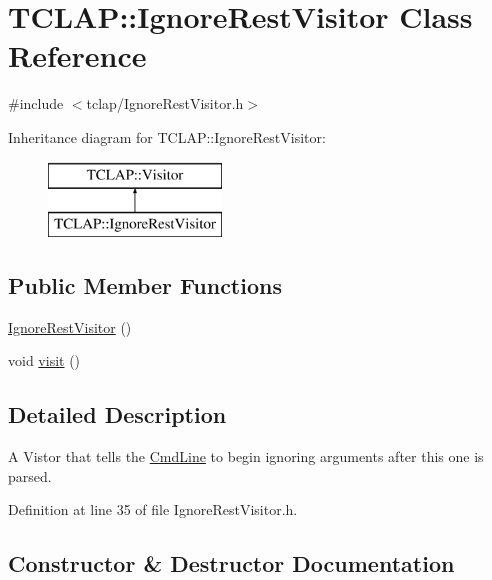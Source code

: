 \hypertarget{class_t_c_l_a_p_1_1_ignore_rest_visitor}{}\section{T\+C\+L\+A\+P\+:\+:Ignore\+Rest\+Visitor Class Reference}
\label{class_t_c_l_a_p_1_1_ignore_rest_visitor}


{\ttfamily \#include $<$tclap/\+Ignore\+Rest\+Visitor.\+h$>$}

Inheritance diagram for T\+C\+L\+A\+P\+:\+:Ignore\+Rest\+Visitor\+:\begin{figure}[H]
\begin{center}
\leavevmode
\includegraphics[height=2.000000cm]{class_t_c_l_a_p_1_1_ignore_rest_visitor}
\end{center}
\end{figure}
\subsection*{Public Member Functions}
\begin{DoxyCompactItemize}
\item 
\hyperlink{class_t_c_l_a_p_1_1_ignore_rest_visitor_a4cd949b7aeff99fba4a8494e02a1cb01}{Ignore\+Rest\+Visitor} ()
\item 
void \hyperlink{class_t_c_l_a_p_1_1_ignore_rest_visitor_ac2a054ed72b16608a32021c65a600722}{visit} ()
\end{DoxyCompactItemize}


\subsection{Detailed Description}
A Vistor that tells the \hyperlink{class_t_c_l_a_p_1_1_cmd_line}{Cmd\+Line} to begin ignoring arguments after this one is parsed. 

Definition at line 35 of file Ignore\+Rest\+Visitor.\+h.



\subsection{Constructor \& Destructor Documentation}
\hypertarget{class_t_c_l_a_p_1_1_ignore_rest_visitor_a4cd949b7aeff99fba4a8494e02a1cb01}{}
